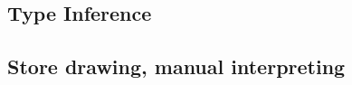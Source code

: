 \documentclass[../codeprint.tex]{subfiles}
\begin{document}
\subsection{Type Inference}


\subsection{Store drawing, manual interpreting}

\end{document}
